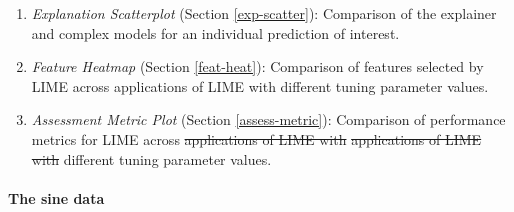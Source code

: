 \documentclass[AMS,STIX2COL]{WileyNJD-v2}\usepackage[]{graphicx}\usepackage[]{color}
\newcommand{\data}{sine data}
\providecommand{\DIFdel}[1]{{\protect\color{red}\sout{#1}}}                      %
\providecommand{\DIFaddbegin}{} %
\providecommand{\DIFaddend}{} %
\providecommand{\DIFdelbegin}{} %
\providecommand{\DIFdelend}{} %
\newcommand{\DIFscaledelfig}{0.5}
\newlength{\DIFdelgraphicswidth} %
\newlength{\DIFdelgraphicsheight} %
\newcommand{\DIFaddincludegraphics}[2][]{{\color{blue}\fbox{\DIFOincludegraphics[#1]{#2}}}} %
\newcommand{\DIFdelincludegraphics}[2][]{%
\sbox{\DIFdelgraphicsbox}{\DIFOincludegraphics[#1]{#2}}%
\settoboxwidth{\DIFdelgraphicswidth}{\DIFdelgraphicsbox} %
\settoboxtotalheight{\DIFdelgraphicsheight}{\DIFdelgraphicsbox} %
\scalebox{\DIFscaledelfig}{%
\parbox[b]{\DIFdelgraphicswidth}{\usebox{\DIFdelgraphicsbox}\\[-\baselineskip] \rule{\DIFdelgraphicswidth}{0em}}\llap{\resizebox{\DIFdelgraphicswidth}{\DIFdelgraphicsheight}{%
\setlength{\unitlength}{\DIFdelgraphicswidth}%
\begin{picture}(1,1)%
\thicklines\linethickness{2pt} %
{\color[rgb]{1,0,0}\put(0,0){\framebox(1,1){}}}%
{\color[rgb]{1,0,0}\put(0,0){\line( 1,1){1}}}%
{\color[rgb]{1,0,0}\put(0,1){\line(1,-1){1}}}%
\end{picture}%
}\hspace*{3pt}}} %
} %
\DeclareRobustCommand{\DIFaddbegin}{\DIFOaddbegin \let\includegraphics\DIFaddincludegraphics} %
\DeclareRobustCommand{\DIFaddend}{\DIFOaddend \let\includegraphics\DIFOincludegraphics} %
\DeclareRobustCommand{\DIFdelbegin}{\DIFOdelbegin \let\includegraphics\DIFdelincludegraphics} %
\DeclareRobustCommand{\DIFdelend}{\DIFOaddend \let\includegraphics\DIFOincludegraphics} %
\begin{document}
\begin{enumerate}
\item \emph{Explanation Scatterplot} (Section \ref{exp-scatter}): Comparison of the explainer and complex models for an individual prediction of interest.
\item \emph{Feature Heatmap} (Section \ref{feat-heat}): Comparison of features selected by LIME across applications of LIME with different tuning parameter values.
\item \emph{Assessment Metric Plot} (Section \ref{assess-metric}): Comparison of performance metrics for LIME across \DIFdelbegin \DIFdel{applications of LIME with }\DIFdelend \DIFaddbegin \sout{applications of LIME with} \DIFaddend different tuning parameter values.
\end{enumerate}

\paragraph{The \data}
\end{document}

